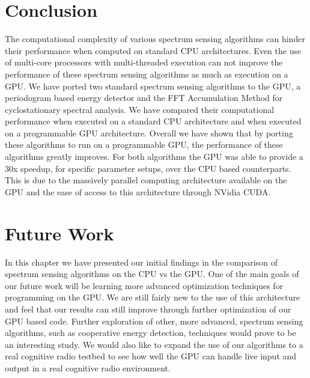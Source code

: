 \section{Conclusion}
\label{sect:gpu_conclusion}
The computational complexity of various spectrum sensing algorithms can hinder their performance when computed on standard CPU architectures.  Even the use of multi-core processors with multi-threaded execution can not improve the performance of these spectrum sensing algorithms as much as execution on a GPU.  We have ported two standard spectrum sensing algorithms to the GPU, a periodogram based energy detector and the FFT Accumulation Method for cyclostationary spectral analysis.  We have compared their computational performance  when executed on a standard CPU architecture and when executed on a programmable GPU architecture.  Overall we have shown that by porting these algorithms to run on a programmable GPU, the performance of these algorithms greatly improves.  For both algorithms the GPU was able to provide a 30x speedup, for specific parameter setups, over the CPU based counterparts.  This is due to the massively parallel computing architecture available on the GPU and the ease of access to this architecture through NVidia CUDA.


\section{Future Work}
\label{sect:gpu_future_work}
In this chapter we have presented our initial findings in the comparison of spectrum sensing algorithms on the CPU vs the GPU.  One of the main goals of our future work will be learning more advanced optimization techniques for programming on the GPU.  We are still fairly new to the use of this architecture and feel that our results can still improve through further optimization of our GPU based code.
Further exploration of other, more advanced, spectrum sensing algorithms, such as cooperative energy detection, techniques would prove to be an interesting study.  We would also like to expand the use of our algorithms to a real cognitive radio testbed to see how well the GPU can handle live input and output in a real cognitive radio environment.


